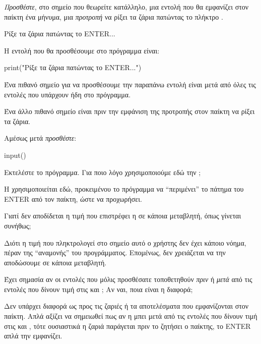 \documentclass[a4paper,11pt,oneside]{book}
\begin{document}
\begin{step}
\emph{Προσθέστε}, στο σημείο που θεωρείτε κατάλληλο, μια εντολή που θα εμφανίζει στον παίκτη ένα μήνυμα, μια \emph{προτροπή} να ρίξει τα ζάρια πατώντας το πλήκτρο .

\marginnote[14pt]{\iconcomputer}
\begin{pyterm}
Ρίξε τα ζάρια πατώντας το ENTER...
\end{pyterm}

\begin{answer}
Η εντολή που θα προσθέσουμε στο πρόγραμμα είναι:
	
\begin{pynew}
print("Ρίξε τα ζάρια πατώντας το ENTER...")
\end{pynew}

Ένα πιθανό σημείο για να προσθέσουμε την παραπάνω εντολή είναι μετά από όλες τις εντολές που υπάρχουν ήδη στο πρόγραμμα.

Ένα άλλο πιθανό σημείο είναι πριν την εμφάνιση της προτροπής στον παίκτη να ρίξει τα ζάρια.
\end{answer}

Αμέσως μετά \emph{προσθέστε}:

\begin{pynew}
input()
\end{pynew}

Εκτελέστε το πρόγραμμα. Για ποιο λόγο χρησιμοποιούμε εδώ την ; 

\begin{answer}
Η  χρησιμοποιείται εδώ, προκειμένου το πρόγραμμα να ``περιμένει'' το πάτημα του  ENTER από τον παίκτη, ώστε να προχωρήσει.
\end{answer}

Γιατί δεν αποδίδεται η τιμή που επιστρέφει η  σε κάποια μεταβλητή, όπως γίνεται συνήθως;

\begin{answer}
Διότι η τιμή που πληκτρολογεί στο σημείο αυτό ο χρήστης δεν έχει κάποιο νόημα, πέραν της ``αναμονής'' του προγράμματος. Επομένως, δεν χρειάζεται να την αποδώσουμε σε κάποια μεταβλητή.
\end{answer}

Έχει σημασία αν οι εντολές που μόλις προσθέσατε τοποθετηθούν \emph{πριν} ή \emph{μετά} από τις εντολές που δίνουν τιμή στις  και ; Αν ναι, ποια είναι η διαφορά; 

\begin{answer}
Δεν υπάρχει διαφορά ως προς τις ζαριές ή τα αποτελέσματα που εμφανίζονται στον παίκτη. Απλά αξίζει να σημειωθεί πως αν η  μπει μετά από τις εντολές που δίνουν τιμή στις  και , τότε ουσιαστικά η ζαριά παράγεται πριν το ζητήσει ο παίκτης, το ENTER απλά την εμφανίζει. 
\end{answer}
\end{step}
\end{document}
